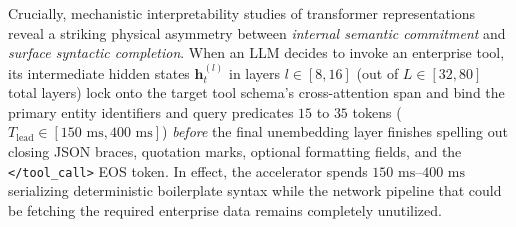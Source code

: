 \documentclass[10pt,conference]{IEEEtran}
\begin{document}
Crucially, mechanistic interpretability studies of transformer representations~\cite{nostalgebraist2020logitlens, belrose2023eliciting, schuster2022confident} reveal a striking physical asymmetry between \emph{internal semantic commitment} and \emph{surface syntactic completion}. When an LLM decides to invoke an enterprise tool, its intermediate hidden states $\mathbf{h}_t^{(l)}$ in layers $l \in [8, 16]$ (out of $L \in [32, 80]$ total layers) lock onto the target tool schema's cross-attention span and bind the primary entity identifiers and query predicates $15$ to $35$ tokens ($T_{\text{lead}} \in [150\text{ ms}, 400\text{ ms}]$) \emph{before} the final unembedding layer finishes spelling out closing JSON braces, quotation marks, optional formatting fields, and the \texttt{</tool\_call>} EOS token. In effect, the accelerator spends $150\text{ ms}$--$400\text{ ms}$ serializing deterministic boilerplate syntax while the network pipeline that could be fetching the required enterprise data remains completely unutilized.
\end{document}
